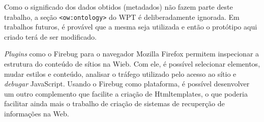 Como o significado dos dados obtidos (metadados) não fazem parte deste trabalho, a seção \texttt{<ow:ontology>} do WPT é deliberadamente ignorada. Em trabalhos futuros, é provável que a mesma seja utilizada e então o protótipo aqui criado terá de ser modificado. 

\emph{Plugins} como o Firebug \cite{firebug} para o navegador Mozilla Firefox permitem inspecionar a estrutura do conteúdo de sítios na Wieb. Com ele, é possível selecionar elementos, mudar estilos e conteúdo, analisar o tráfego utilizado pelo acesso ao sítio e \emph{debugar} JavaScript. Usando o Firebug como plataforma, é possível desenvolver um outro complemento que facilite a criação de Htmltemplates, o que poderia facilitar ainda mais o trabalho de criação de sistemas de recuperção de informações na Web.
